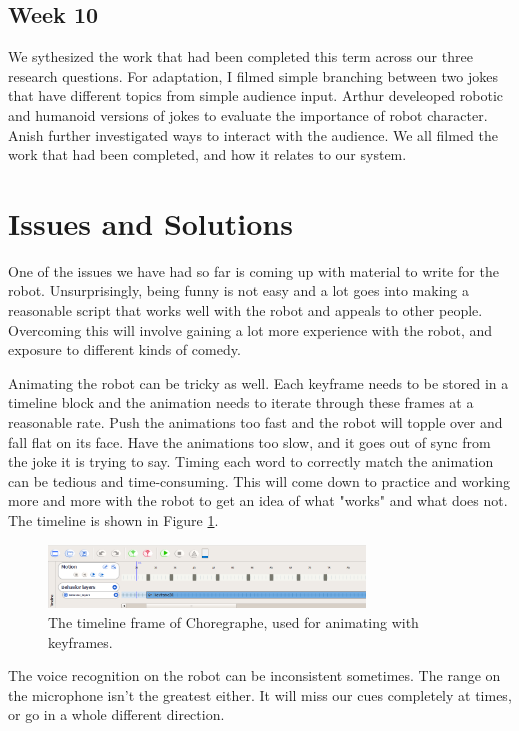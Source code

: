 \documentclass[onecolumn, draftclsnofoot,10pt, compsoc]{IEEEtran}
\begin{document}
\subsection{Week 10}
	We sythesized the work that had been completed this term across our three research questions. For adaptation, I filmed simple branching between two jokes that have different topics from simple audience input. Arthur develeoped robotic and humanoid versions of jokes to evaluate the importance of robot character. Anish further investigated ways to interact with the audience. We all filmed the work that had been completed, and how it relates to our system.
\section{Issues and Solutions}
One of the issues we have had so far is coming up with material to write for the robot. Unsurprisingly, being funny is not easy and a lot goes into making a reasonable script that works well with the robot and appeals to other people. Overcoming this will involve gaining a lot more experience with the robot, and exposure to different kinds of comedy.

Animating the robot can be tricky as well. Each keyframe needs to be stored in a timeline block and the animation needs to iterate through these frames at a reasonable rate. Push the animations too fast and the robot will topple over and fall flat on its face. Have the animations too slow, and it goes out of sync from the joke it is trying to say. Timing each word to correctly match the animation can be tedious and time-consuming. This will come down to practice and working more and more with the robot to get an idea of what "works" and what does not. The timeline is shown in Figure \ref{fig:timeline}.

\begin{figure}[H]
  \centering
  \includegraphics[width=0.75\textwidth,height=0.75\textheight,keepaspectratio]{timeline}
  \caption{The timeline frame of Choregraphe, used for animating with keyframes.}
	\label{fig:timeline}
\end{figure}

The voice recognition on the robot can be inconsistent sometimes. The range on the microphone isn't the greatest either. It will miss our cues completely at times, or go in a whole different direction.
\end{document}
